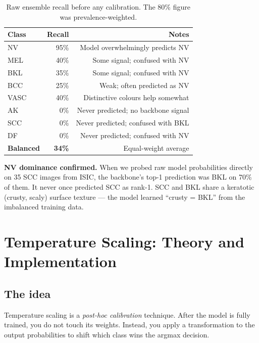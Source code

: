 \documentclass[12pt,a4paper]{article}
\begin{document}
\begin{table}[h]
\centering
\begin{tabular}{lrr}
\toprule
\textbf{Class} & \textbf{Recall} & \textbf{Notes} \\
\midrule
NV    & 95\% & Model overwhelmingly predicts NV \\
MEL   & 40\% & Some signal; confused with NV \\
BKL   & 35\% & Some signal; confused with NV \\
BCC   & 25\% & Weak; often predicted as NV \\
VASC  & 40\% & Distinctive colours help somewhat \\
AK    & 0\%  & Never predicted; no backbone signal \\
SCC   & 0\%  & Never predicted; confused with BKL \\
DF    & 0\%  & Never predicted; confused with NV \\
\midrule
\textbf{Balanced} & \textbf{34\%} & Equal-weight average \\
\bottomrule
\end{tabular}
\caption{Raw ensemble recall before any calibration. The 80\% figure was prevalence-weighted.}
\end{table}

\begin{insight}
\textbf{NV dominance confirmed.} When we probed raw model probabilities directly on 35 SCC
images from ISIC, the backbone's top-1 prediction was BKL on 70\% of them. It never once
predicted SCC as rank-1. SCC and BKL share a keratotic (crusty, scaly) surface texture ---
the model learned ``crusty = BKL'' from the imbalanced training data.
\end{insight}

\section{Temperature Scaling: Theory and Implementation}

\subsection{The idea}

Temperature scaling is a \emph{post-hoc calibration} technique. After the model is fully
trained, you do not touch its weights. Instead, you apply a transformation to the output
probabilities to shift which class wins the argmax decision.
\end{document}
